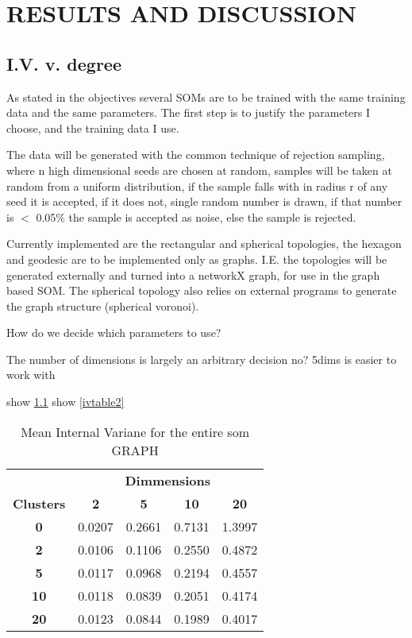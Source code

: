 \chapter{RESULTS AND DISCUSSION}




\section{I.V. v. degree}

As stated in the objectives several SOMs are to be trained with the same
training data and the same parameters.  The first step is to justify the
parameters I choose, and the training data I use.

The data will be generated with the common technique of rejection sampling,
where n high dimensional seeds are chosen at random, samples will be taken
at random from a uniform distribution, if the sample falls with in radius r of
any seed it is accepted, if it does not, single random number is drawn, if that
number is \(<\) 0.05\% the sample is accepted as noise, else the sample is rejected.

Currently implemented are the rectangular and spherical topologies, the hexagon
and geodesic are to be implemented only as graphs.  I.E. the topologies will be
generated externally and turned into a networkX graph, for use in the graph
based SOM. The spherical topology also relies on external programs to generate
the graph structure (spherical voronoi).

How do we decide which parameters to use?

The number of dimensions is largely an arbitrary decision no?
5dims is easier to work with

show \ref{ivtable1}
show \ref{ivtable2}

\begin{table}
\caption{Mean Internal Variane for the entire som GRAPH}
\label{ivtable1}
\begin{tabular}{|c||c|c|c|c|}
\hline
&\multicolumn{4}{c|}{\textbf{Dimmensions}}\\
\textbf{Clusters} & \multicolumn{1}{c}{\textbf{2}} &
\multicolumn{1}{c}{\textbf{5}} & \multicolumn{1}{c}{\textbf{10}} &
\multicolumn{1}{c|}{\textbf{20}}\\
\hline
\hline
\textbf{0} & 0.0207& 0.2661& 0.7131& 1.3997 \\
\hline
\textbf{2} & 0.0106& 0.1106& 0.2550& 0.4872 \\
\hline
\textbf{5} & 0.0117& 0.0968& 0.2194& 0.4557 \\
\hline
\textbf{10} & 0.0118& 0.0839& 0.2051& 0.4174 \\
\hline
\textbf{20} & 0.0123& 0.0844& 0.1989& 0.4017 \\
\hline
\end{tabular} \end{table}




